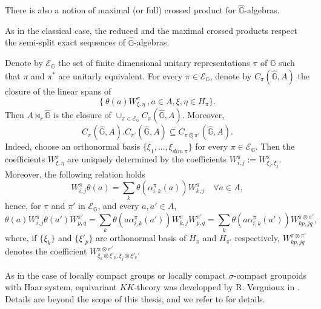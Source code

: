 \begin{rk}
There is also a notion of maximal (or full) crossed product for $\hat{\mathbb G}$-algebras.
\end{rk}

\begin{rk}
As in the classical case, the reduced and the maximal crossed products respect the semi-split exact sequences of $\hat{\mathbb G}$-algebras.
\end{rk}

\begin{rk} Denote by $\mathcal E_{\mathbb G}$ the set of finite dimensional unitary representations $\pi$ of $\mathbb G$ such that $\pi$ and $\pi^*$ are unitarly equivalent. For every $\pi\in \mathcal E_{\mathbb G}$, denote by $C_\pi(\hat{\mathbb G}, A)$ the closure of the linear spans of 
\[\{\ \theta(a) W_{\xi,\eta}^\pi \ ,a\in A, \xi,\eta\in H_\pi\}.\]
Then $A\rtimes_r \hat{\mathbb G}$ is the closure of $\cup_{\pi\in \mathcal E_{\mathbb G}} C_\pi(\hat{\mathbb G}, A)$. Moreover,
\[C_\pi(\hat{\mathbb G}, A).C_{\pi'}(\hat{\mathbb G}, A) \subseteq C_{\pi \otimes \pi'}(\hat{\mathbb G}, A).\]
Indeed, choose an orthonormal basis $\{\xi_1,...,\xi_{dim\ \pi}\}$ for every $\pi\in\mathcal E_{\mathbb G}$. Then the coefficients $W_{\xi,\eta}^\pi$ are uniquely determined by the coefficients $W_{i,j}^\pi := W_{\xi_i,\xi_j}^\pi$. Moreover, the following relation holds
\[W_{i,j}^\pi \theta(a)= \sum_k \theta(\alpha_{i,k}^\pi(a)) W_{k,j}^\pi \quad \forall a\in A,\]
hence, for $\pi$ and $\pi'$ in $\mathcal E_{\mathbb G}$, and every $a,a'\in A$,
\[\theta(a) W_{i,j}^\pi \theta(a')W_{p,q}^{\pi'} = \sum_k \theta(a \alpha_{i,k}^{\pi}(a')) W_{k,j}^\pi W_{p,q}^{\pi'} 
= \sum_k \theta(a \alpha_{i,k}^{\pi}(a')) W_{kp,jq}^{\pi\otimes \pi'}, \]
where, if $\{\xi_k\}$ and $\{\xi'_p\}$ are orthonormal basis of $H_\pi$ and $H_{\pi'}$ respectively, $W_{kp,jq}^{\pi\otimes \pi'}$ denotes the coefficient $W_{\xi_k\otimes \xi'_p,\xi_j \otimes \xi'_q}^{\pi\otimes \pi'}$.
\end{rk}

As in the case of locally compact groups or locally compact $\sigma$-compact groupoids with Haar system, equivariant $KK$-theory was developped by R. Vergnioux in \cite{vergnioux}. Details are beyond the scope of this thesis, and we refer to \cite{vergnioux} for details.\\

